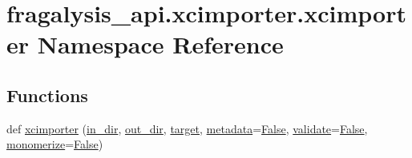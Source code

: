\hypertarget{namespacefragalysis__api_1_1xcimporter_1_1xcimporter}{}\section{fragalysis\+\_\+api.\+xcimporter.\+xcimporter Namespace Reference}
\label{namespacefragalysis__api_1_1xcimporter_1_1xcimporter}
\subsection*{Functions}
\begin{DoxyCompactItemize}
\item 
def \hyperlink{namespacefragalysis__api_1_1xcimporter_1_1xcimporter_a673f390dc6b7d0062ec8d9510079dded}{xcimporter} (\hyperlink{namespacefragalysis__api_1_1xcimporter_1_1xcimporter_a7795d815fddc45b40750fc66e5d8ac4f}{in\+\_\+dir}, \hyperlink{namespacefragalysis__api_1_1xcimporter_1_1xcimporter_a48b550a7c1c2ca499d6f204c133ae41d}{out\+\_\+dir}, \hyperlink{namespacefragalysis__api_1_1xcimporter_1_1xcimporter_a2c93b8722226ac96f6668b2fc07515e8}{target}, \hyperlink{namespacefragalysis__api_1_1xcimporter_1_1xcimporter_a3414d616d16bdcc9b7bbfd56591a406d}{metadata}=\hyperlink{namespacefragalysis__api_1_1xcimporter_1_1xcimporter_a7b54c2ad280b13dc0833892106613e4c}{False}, \hyperlink{namespacefragalysis__api_1_1xcimporter_1_1xcimporter_a07274a26173246021e82b830b0ab30e6}{validate}=\hyperlink{namespacefragalysis__api_1_1xcimporter_1_1xcimporter_a7b54c2ad280b13dc0833892106613e4c}{False}, \hyperlink{namespacefragalysis__api_1_1xcimporter_1_1xcimporter_ad083b3fa69a0bec8eb92ccb08911f2ef}{monomerize}=\hyperlink{namespacefragalysis__api_1_1xcimporter_1_1xcimporter_a7b54c2ad280b13dc0833892106613e4c}{False})
\end{DoxyCompactItemize}
